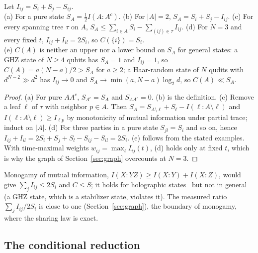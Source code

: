 \begin{prop}\label{prop:graph}\stE{}
Let $I_{ij}=S_i+S_j-S_{ij}$.\\
(a) For a pure state $S_A=\tfrac12I(A\!:\!A^c)$. (b) For $|A|=2$, $S_A=S_i+S_j-I_{ij}$. (c) For every spanning tree $\tau$ on $A$, $S_A\le\sum_{i\in A}S_i-\sum_{(ij)\in\tau}I_{ij}$. (d) For $N=3$ and every fixed $t$, $I_{ij}+I_{il}=2S_i$, so $C(\{i\})=S_i$.\\
(e) $C(A)$ is neither an upper nor a lower bound on $S_A$ for general states: a GHZ state of $N\ge4$ qubits has $S_A=1$ and $I_{ij}=1$, so $C(A)=a(N-a)/2>S_A$ for $a\ge2$; a Haar-random state of $N$ qudits with $d^{N-2}\gg d^{2}$ has $I_{ij}\to0$ and $S_A\to\min(a,N-a)\log_2d$, so $C(A)\ll S_A$.
\end{prop}
\begin{proof}
(a) For pure $AA^c$, $S_{A^c}=S_A$ and $S_{AA^c}=0$. (b) is the definition. (c) Remove a leaf $\ell$ of $\tau$ with neighbor $p\in A$. Then $S_A=S_{A\setminus\ell}+S_\ell-I(\ell\!:\!A\setminus\ell)$ and $I(\ell\!:\!A\setminus\ell)\ge I_{\ell p}$ by monotonicity of mutual information under partial trace; induct on $|A|$.
(d) For three parties in a pure state $S_{jl}=S_i$ and so on, hence $I_{ij}+I_{il}=2S_i+S_j+S_l-S_{ij}-S_{il}=2S_i$. (e) follows from the stated examples. With time-maximal weights $w_{ij}=\max_tI_{ij}(t)$, (d) holds only at fixed $t$, which is why the graph of Section~\ref{sec:graph} overcounts at $N=3$.
\end{proof}
Monogamy of mutual information, $I(X\!:\!YZ)\ge I(X\!:\!Y)+I(X\!:\!Z)$, would give $\sum_jI_{ij}\le2S_i$ and $C\le S$; it holds for holographic states~\cite{hayden2013} but not in general (a GHZ state, which is a stabilizer state, violates it). The measured ratio $\sum_jI_{ij}/2S_i$ is close to one (Section~\ref{sec:graph}), the boundary of monogamy, where the sharing law is exact.

\subsection{The conditional reduction}

